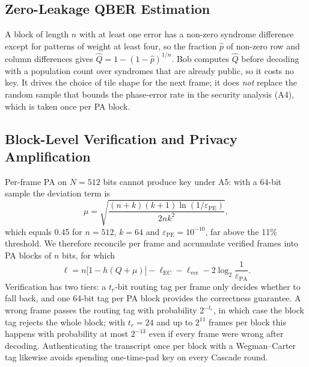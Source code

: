 \documentclass[conference]{IEEEtran}
\begin{document}
\subsection{Zero-Leakage QBER Estimation}
A block of length $n$ with at least one error has a non-zero syndrome difference except for patterns of weight at least four, so the fraction $\hat p$ of non-zero row and column differences gives $\hat Q = 1-(1-\hat p)^{1/n}$. Bob computes $\hat Q$ before decoding with a population count over syndromes that are already public, so it costs no key. It drives the choice of tile shape for the next frame; it does \emph{not} replace the random sample that bounds the phase-error rate in the security analysis (A4), which is taken once per PA block.

\subsection{Block-Level Verification and Privacy Amplification}\label{sec:block}
Per-frame PA on $N=512$ bits cannot produce key under A5: with a 64-bit sample the deviation term is
\begin{equation}
\mu=\sqrt{\frac{(n+k)(k+1)\ln(1/\varepsilon_{\mathrm{PE}})}{2nk^{2}}},
\label{eq:mu}
\end{equation}
which equals 0.45 for $n=512$, $k=64$ and $\varepsilon_{\mathrm{PE}}=10^{-10}$, far above the 11\% threshold. We therefore reconcile per frame and accumulate verified frames into PA blocks of $n$ bits, for which
\begin{equation}
\ell=n\bigl[1-h(Q+\mu)\bigr]-\ell_{\mathrm{EC}}-\ell_{\mathrm{ver}}-2\log_2\!\frac{1}{\varepsilon_{\mathrm{PA}}}.
\label{eq:ell}
\end{equation}
Verification has two tiers: a $t_r$-bit routing tag per frame only decides whether to fall back, and one 64-bit tag per PA block provides the correctness guarantee. A wrong frame passes the routing tag with probability $2^{-t_r}$, in which case the block tag rejects the whole block; with $t_r=24$ and up to $2^{11}$ frames per block this happens with probability at most $2^{-13}$ even if every frame were wrong after decoding. Authenticating the transcript once per block with a Wegman--Carter tag \cite{wegmancarter1981} likewise avoids spending one-time-pad key on every Cascade round.
\end{document}
